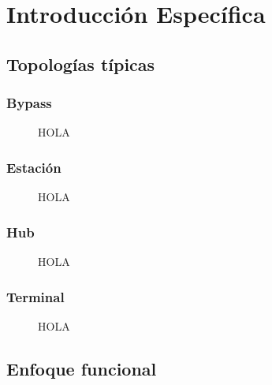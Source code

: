 \chapter{Introducción Específica} %

\label{Chapter2}

\section{Topologías típicas}
	\subsection{Bypass}

			\begin{figure}[h]
			\centering
				\caption{HOLA}
				\label{fig:hola}
			\end{figure}
			
	\subsection{Estación}

			\begin{figure}[h]
			\centering
				\caption{HOLA}
				\label{fig:hola}
			\end{figure}
	
	\subsection{Hub}

			\begin{figure}[h]
			\centering
				\caption{HOLA}
				\label{fig:hola}
			\end{figure}
	
	\subsection{Terminal}

			\begin{figure}[h]
			\centering
				\caption{HOLA}
				\label{fig:hola}
			\end{figure}
							
\section{Enfoque funcional}

